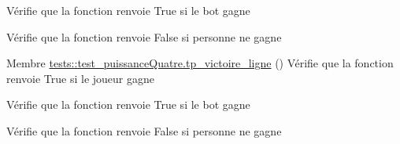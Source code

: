 \begin{DoxyRefList}
Vérifie que la fonction renvoie True si le bot gagne 

Vérifie que la fonction renvoie False si personne ne gagne 
\item[Membre \mbox{\hyperlink{namespacetests_1_1test__puissanceQuatre_a35ef85b234ed41628b728d3daeda6d29}{tests\+::test\+\_\+puissance\+Quatre.tp\+\_\+victoire\+\_\+ligne}} ()]\label{test__test000004}%
%
Vérifie que la fonction renvoie True si le joueur gagne 

Vérifie que la fonction renvoie True si le bot gagne 

Vérifie que la fonction renvoie False si personne ne gagne
\end{DoxyRefList}